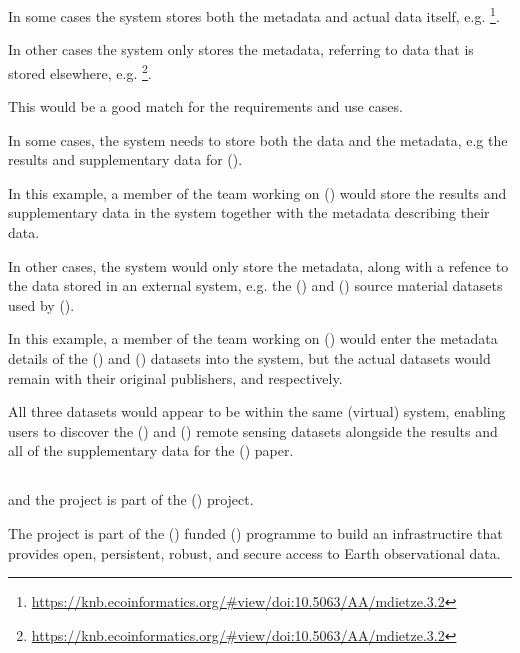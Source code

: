 \documentclass{article}
\begin{document}
In some cases the \cite{metacat} system stores both the metadata and actual
data itself, e.g.
\footnote{\url{https://knb.ecoinformatics.org/#view/doi:10.5063/AA/mdietze.3.2}}.

In other cases the \cite{metacat} system only stores the metadata, referring
to data that is stored elsewhere, e.g.
\footnote{\url{https://knb.ecoinformatics.org/#view/doi:10.5063/AA/mdietze.3.2}}.

This would be a good match for the \cite{trop} requirements and use cases.

In some cases, the \cite{trop} system needs to store both the data and the
metadata, e.g the results and supplementary data for (\cite{mitchard-2014}).

In this example, a member of the team working on (\cite{mitchard-2014})
would store the results and supplementary data in the \cite{trop} system
together with the metadata describing their data.

In other cases, the \cite{trop} system would only store the metadata,
along with a refence to the data stored in an external system, e.g. the
(\cite{saatchi-2011}) and (\cite{baccini-2012}) source material datasets
used by (\cite{mitchard-2014}).

In this example, a member of the team working on (\cite{mitchard-2014})
would enter the metadata details of the (\cite{saatchi-2011}) and
(\cite{baccini-2012}) datasets into the \cite{trop} system, but
the actual datasets would remain with their original publishers,
 and  respectively.

All three datasets would appear to be within the same (virtual)
system, enabling \cite{trop} users to discover the (\cite{saatchi-2011})
and (\cite{baccini-2012}) remote sensing datasets alongside the results
and all of the supplementary data for the (\cite{mitchard-2014}) paper.

\subsection{}

\cite{metacat} and the \cite{knb} project is part of the  (\cite{data-one})
project.

The \cite{data-one} project is part of the  (\cite{nsf})
funded  (\cite{data-net}) programme to build an
infrastructire that provides open, persistent, robust, and secure access
to Earth observational data.
 
\end{document}
